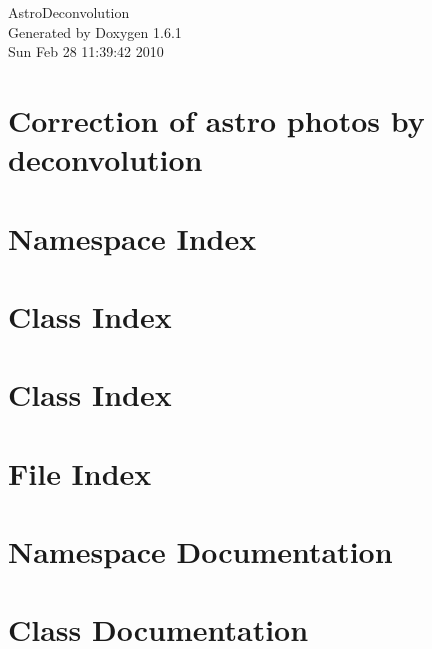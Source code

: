 \documentclass[a4paper]{book}
\begin{document}
\begin{titlepage}
\vspace*{7cm}
\begin{center}
{\Large AstroDeconvolution }\\
\vspace*{1cm}
{\large Generated by Doxygen 1.6.1}\\
\vspace*{0.5cm}
{\small Sun Feb 28 11:39:42 2010}\\
\end{center}
\end{titlepage}
\clearemptydoublepage
{}
\tableofcontents
\clearemptydoublepage
{}
\chapter{Correction of astro photos by deconvolution}
\label{index}
\chapter{Namespace Index}

\chapter{Class Index}

\chapter{Class Index}

\chapter{File Index}

\chapter{Namespace Documentation}


\chapter{Class Documentation}





















\end{document}
